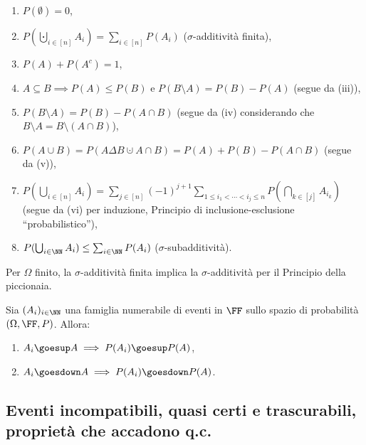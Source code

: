 \begin{multicols*}{2}
\begin{proposition}[Proprietà di $P$]
        \begin{enumerate}[(i.)]
            \item $P(\emptyset) = 0$,
            \item $P(\bigcupdot_{i \in [n]} A_i) = \sum_{i \in [n]} P(A_i)$ ($\sigma$-additività finita),
            \item $P(A) + P(A^c) = 1$,
            \item $A \subseteq B \implies P(A) \leq P(B)$ e $P(B \setminus A) = P(B) - P(A)$ (segue da (iii)),
            \item $P(B \setminus A) = P(B) - P(A \cap B)$ (segue da (iv) considerando che $B \setminus A = B \setminus (A \cap B)$),
            \item $P(A \cup B) = P(A \Delta B \cupdot A \cap B) = P(A) + P(B) - P(A \cap B)$ (segue da (v)),
            \item $P(\bigcup_{i \in [n]} A_i) = \sum_{j \in [n]} (-1)^{j+1} \sum_{1 \leq i_1 < \cdots < i_j \leq n} P(\bigcap_{k \in [j]} A_{i_{k}})$ (segue da (vi) per induzione, Principio di inclusione-esclusione ``probabilistico''),
            \item $P(\bigcup_{i \in \NN} A_i) \leq \sum_{i \in \NN} P(A_i)$ ($\sigma$-subadditività).
        \end{enumerate}
    \end{proposition}

    \begin{remark}
        Per $\Omega$ finito, la $\sigma$-additività finita implica la $\sigma$-additività per il Principio della piccionaia.
    \end{remark}

    \begin{proposition}
        Sia $(A_i)_{i \in \NN}$ una famiglia numerabile di
        eventi in $\FF$ sullo spazio di probabilità
        $(\Omega, \FF, P)$. Allora:

        \begin{enumerate}[(i.)]
            \item $A_i \goesup A \implies P(A_i) \goesup P(A)$,
            \item $A_i \goesdown A \implies P(A_i) \goesdown P(A)$.
        \end{enumerate}
    \end{proposition}

    \subsection{Eventi incompatibili, quasi certi e trascurabili, proprietà che accadono q.c.}


\end{multicols*}
